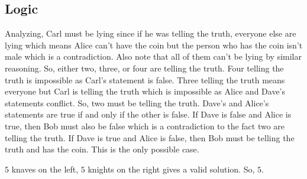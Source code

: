 \documentclass[11pt]{article}
\begin{document}
\subsection{Logic}

\begin{sol}
Analyzing, Carl must be lying since if he was telling the truth, everyone else are lying which means Alice can't have the coin but the person who has the coin isn't male which is a contradiction. Also note that all of them can't be lying by similar reasoning. So, either two, three, or four are telling the truth. Four telling the truth is impossible as Carl's statement is false. Three telling the truth means everyone but Carl is telling the truth which is impossible as Alice and Dave's statements conflict. So, two must be telling the truth. Dave's and Alice's statements are true if and only if the other is false. If Dave is false and Alice is true, then Bob must also be false which is a contradiction to the fact two are telling the truth. If Dave is true and Alice is false, then Bob must be telling the truth and  has the coin. This is the only possible case.
\end{sol}


\begin{sol}
$5$ knaves on the left, $5$ knights on the right gives a valid solution. So, $\boxed{5}$.
\end{sol}
\end{document}
